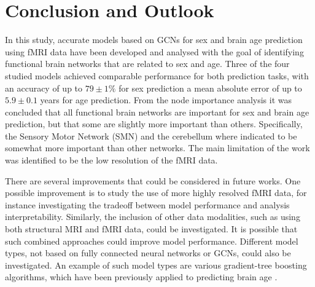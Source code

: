 

\chapter{Conclusion and Outlook}

In this study, accurate models based on GCNs for sex and brain age prediction using fMRI data have been developed and analysed with the goal of identifying functional brain networks that are related to sex and age. Three of the four studied models achieved comparable performance for both prediction tasks, with an accuracy of up to $79\pm1\%$ for sex prediction a mean absolute error of up to $5.9\pm0.1$ years for age prediction. From the node importance analysis it was concluded that all functional brain networks are important for sex and brain age prediction, but that some are slightly more important than others. Specifically, the Sensory Motor Network (SMN) and the cerebellum where indicated to be somewhat more important than other networks. The main limitation of the work was identified to be the low resolution of the fMRI data.

There are several improvements that could be considered in future works. One possible improvement is to study the use of more highly resolved fMRI data, for instance investigating the tradeoff between model performance and analysis interpretability. Similarly, the inclusion of other data modalities, such as using both structural MRI and fMRI data, could be investigated. It is possible that such combined approaches could improve model performance. Different model types, not based on fully connected neural networks or GCNs, could also be investigated. An example of such model types are various gradient-tree boosting algorithms, which have been previously applied to predicting brain age \cite{kaufmann}.

